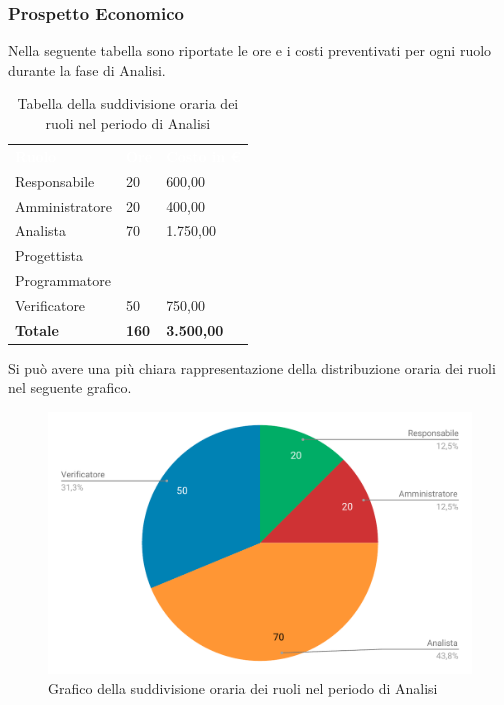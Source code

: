 \subsubsection{Prospetto Economico}
Nella seguente tabella sono riportate le ore e i costi preventivati per ogni ruolo durante la fase di Analisi.


\begin{table}[H]	
	\begin{center}
	    \begin{tabular}{C{4cm}C{1cm}C{3,5cm}}
			\textcolor{white}{\textbf{Ruolo}} & \textcolor{white}{\textbf{Ore}} & \textcolor{white}{\textbf{Costo in €}}
			\\
			Responsabile & 20 & 600,00 \\
			Amministratore & 20 & 400,00 \\
			Analista & 70 & 1.750,00 \\
			Progettista &  & \\
			Programmatore &  & \\
			Verificatore & 50 & 750,00 \\
			\textbf{Totale} & \textbf{160} & \textbf{3.500,00} \\
		\end{tabular}
	    \caption{Tabella della suddivisione oraria dei ruoli nel periodo di Analisi} \label{tab:tabellaRuoliAnalisi} 
	\end{center}
\end{table}


Si può avere una più chiara rappresentazione della distribuzione oraria dei ruoli nel seguente grafico.

\begin{figure}[H]
	\includegraphics[width=1\linewidth]{Preventivo/grafici/AN2.pdf}
	\caption{Grafico della suddivisione oraria dei ruoli nel periodo di Analisi}
\end{figure}

